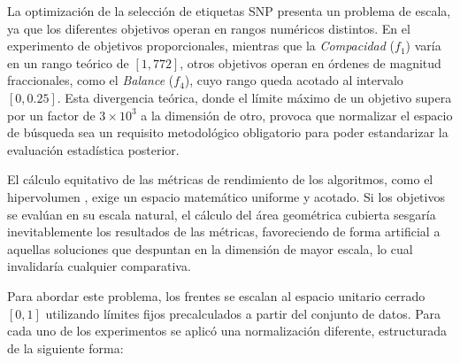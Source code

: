 La optimización de la selección de etiquetas SNP presenta un problema de escala, ya que los diferentes objetivos operan en rangos numéricos distintos. En el experimento de objetivos proporcionales, mientras que la \textit{Compacidad} ($f_1$) varía en un rango teórico de $[1, 772]$, otros objetivos operan en órdenes de magnitud fraccionales, como el \textit{Balance} ($f_4$), cuyo rango queda acotado al intervalo $[0, 0.25]$. Esta divergencia teórica, donde el límite máximo de un objetivo supera por un factor de $3 \times 10^3$ a la dimensión de otro, provoca que normalizar el espacio de búsqueda sea un requisito metodológico obligatorio para poder estandarizar la evaluación estadística posterior.

El cálculo equitativo de las métricas de rendimiento de los algoritmos, como el hipervolumen \cite{zitzler1999multiobjective}, exige un espacio matemático uniforme y acotado. Si los objetivos se evalúan en su escala natural, el cálculo del área geométrica cubierta sesgaría inevitablemente los resultados de las métricas, favoreciendo de forma artificial a aquellas soluciones que despuntan en la dimensión de mayor escala, lo cual invalidaría cualquier comparativa.

Para abordar este problema, los frentes se escalan al espacio unitario cerrado $[0, 1]$ utilizando límites fijos precalculados a partir del conjunto de datos. Para cada uno de los experimentos se aplicó una normalización diferente, estructurada de la siguiente forma:

